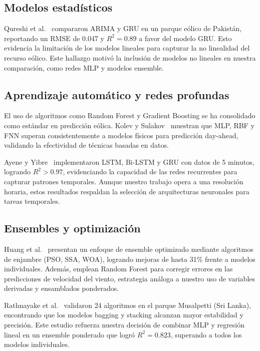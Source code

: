\documentclass[conference]{IEEEtran}
\begin{document}
\subsection{Modelos estadísticos}
	
Qureshi et al.~\cite{qureshi2023shortterm} compararon ARIMA y GRU en un parque eólico de Pakistán, reportando un RMSE de 0.047 y \(R^2 = 0.89\) a favor del modelo GRU. Esto evidencia la limitación de los modelos lineales para capturar la no linealidad del recurso eólico. Este hallazgo motivó la inclusión de modelos no lineales en nuestra comparación, como redes MLP y modelos ensemble.
	
\subsection{Aprendizaje automático y redes profundas}
	
El uso de algoritmos como Random Forest y Gradient Boosting se ha consolidado como estándar en predicción eólica. Kolev y Sulakov~\cite{kolev2019forecasting} muestran que MLP, RBF y FNN superan consistentemente a modelos físicos para predicción day-ahead, validando la efectividad de técnicas basadas en datos.
	
Ayene y Yibre~\cite{ayene2024wind} implementaron LSTM, Bi-LSTM y GRU con datos de 5 minutos, logrando \(R^2 > 0.97\), evidenciando la capacidad de las redes recurrentes para capturar patrones temporales. Aunque nuestro trabajo opera a una resolución horaria, estos resultados respaldan la selección de arquitecturas neuronales para tareas temporales.
	
\subsection{Ensembles y optimización}
	
Huang et al.~\cite{huang2023ensemble} presentan un enfoque de ensemble optimizado mediante algoritmos de enjambre (PSO, SSA, WOA), logrando mejoras de hasta 31\% frente a modelos individuales. Además, emplean Random Forest para corregir errores en las predicciones de velocidad del viento, estrategia análoga a nuestro uso de variables derivadas y ensamblados ponderados.
	
Rathnayake et al.~\cite{rathnayake2025predicting} validaron 24 algoritmos en el parque Musalpetti (Sri Lanka), encontrando que los modelos bagging y stacking alcanzan mayor estabilidad y precisión. Este estudio refuerza nuestra decisión de combinar MLP y regresión lineal en un ensemble ponderado que logró \(R^2 = 0.823\), superando a todos los modelos individuales.
	
\end{document}
